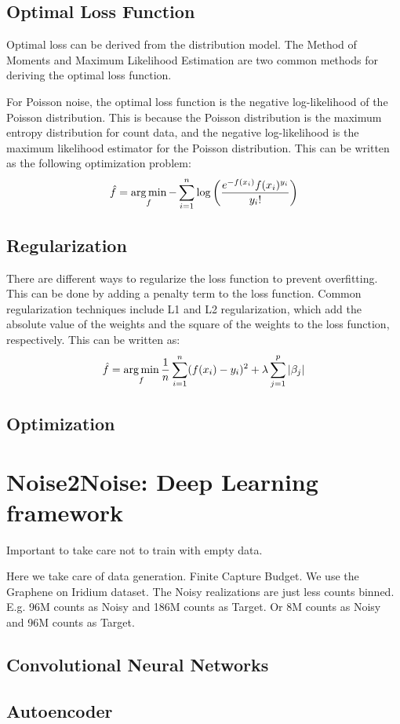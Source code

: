 \subsection{Optimal Loss Function}
Optimal loss can be derived from the distribution model. The Method of Moments and Maximum Likelihood Estimation are two common methods for deriving the optimal loss function. 

For Poisson noise, the optimal loss function is the negative log-likelihood of the Poisson distribution. This is because the Poisson distribution is the maximum entropy distribution for count data, and the negative log-likelihood is the maximum likelihood estimator for the Poisson distribution.
This can be written as the following optimization problem:
\begin{equation}
    \hat{f} = \operatorname*{arg\,min}_f -\sum_{i=1}^{n} \log \left( \frac{e^{-f(x_i)} f(x_i)^{y_i}}{y_i!} \right)
\end{equation}


\subsection{Regularization}
There are different ways to regularize the loss function to prevent overfitting. This can be done by adding a penalty term to the loss function. Common regularization techniques include L1 and L2 regularization, which add the absolute value of the weights and the square of the weights to the loss function, respectively. This can be written as:
\begin{equation}
    \hat{f} = \operatorname*{arg\,min}_f \frac{1}{n} \sum_{i=1}^{n} (f(x_i) - y_i)^{2} + \lambda \sum_{j=1}^{p} \left| \beta_j \right|
\end{equation}

\subsection{Optimization}
\section{Noise2Noise: Deep Learning framework}
Important to take care not to train with empty data. 

Here we take care of data generation. Finite Capture Budget. We use the Graphene on Iridium dataset. The Noisy realizations are just less counts binned. 
E.g. 96M counts as Noisy and 186M counts as Target. Or 8M counts as Noisy and 96M counts as Target.
\subsection{Convolutional Neural Networks}
\subsection{Autoencoder}